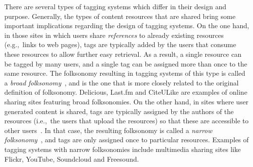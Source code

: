 There are several types of tagging systems which differ in their design and purpose. Generally, the types of content resources that are shared bring some important implications regarding the design of tagging systems. On the one hand, in those sites in which users share \emph{references} to already existing resources (e.g.,~links to web pages), tags are typically added by the users that consume these resources to allow further easy retrieval. As a result, a single resource can be tagged by many users, and a single tag can be assigned more than once to the same resource. The folksonomy resulting in tagging systems of this type is called a \emph{broad folksonomy}~\citep{Wal2007BroadNarrow}, and is the one that is more closely related to the original definition of folksonomy. Delicious, Last.fm  and CiteULike are examples of online sharing sites featuring broad folksonomies. 
On the other hand, in sites where user generated content is shared, tags are typically assigned by the authors of the resources (i.e.,~the users that upload the resources) so that these are accessible to other users~\citep{Cattuto2006}. In that case, the resulting folksonomy is called a \emph{narrow folksonomy}~\citep{Wal2007BroadNarrow}, and tags are only assigned once to particular resources. Examples of tagging systems with narrow folksonomies include multimedia sharing sites like Flickr, YouTube, Soundcloud and Freesound.

